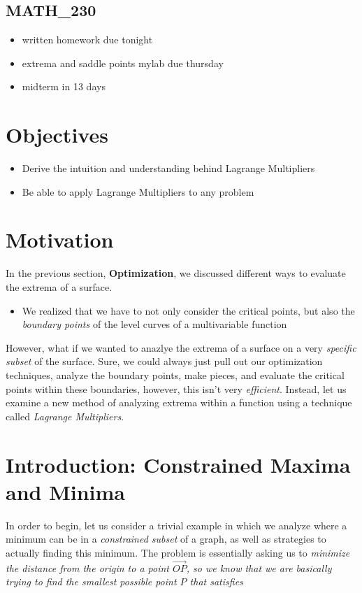 \documentclass{report}
\begin{document}
\begin{sloppypar}
\begin{itemize}
\end{itemize}

\subsection{MATH\_230}
\begin{itemize}
  \item written homework due tonight
  \item extrema and saddle points mylab due thursday
  \item midterm in 13 days
\end{itemize}



\section{Objectives}
\begin{itemize}
  \item Derive the intuition and understanding behind Lagrange Multipliers
  \item Be able to apply Lagrange Multipliers to any problem
\end{itemize}

\section{Motivation}
In the previous section, \textbf{Optimization}, we discussed different ways to evaluate the extrema of a surface.
\begin{itemize}
  \item We realized that we have to not only consider the critical points, but also the \textit{boundary points} of the level curves of a multivariable function

\end{itemize}
However, what if we wanted to anazlye the extrema of a surface on a very \textit{specific subset} of the surface. Sure, we could always just pull out our optimization techniques, analyze the boundary points, make pieces, and evaluate the critical points within these boundaries, however, this isn't very \textit{efficient}. Instead, let us examine a new method of analyzing extrema within a function using a technique called \textit{Lagrange Multipliers}.

\section{Introduction: Constrained Maxima and Minima}
In order to begin, let us consider a trivial example in which we analyze where a minimum can be in a \textit{constrained subset} of a graph, as well as strategies to actually finding this minimum.
\sol The problem is essentially asking us to \textit{minimize the distance from the origin to a point $\overrightarrow{OP}$, so we know that we
  are basically trying to find the smallest possible
  point $ P$ that satisfies}


\end{sloppypar}
\end{document}
